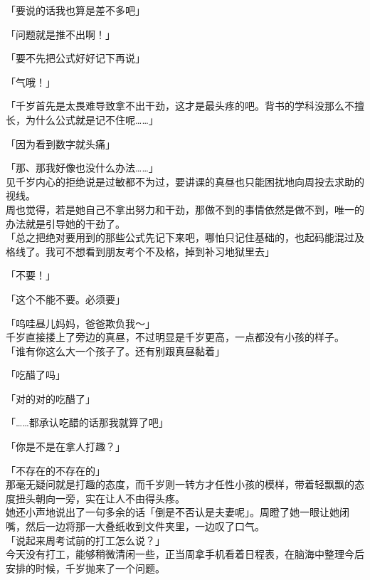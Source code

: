 「要说的话我也算是差不多吧」

「问题就是推不出啊！」

「要不先把公式好好记下再说」

「气哦！」

「千岁首先是太畏难导致拿不出干劲，这才是最头疼的吧。背书的学科没那么不擅长，为什么公式就是记不住呢……」

「因为看到数字就头痛」

「那、那我好像也没什么办法……」\\

见千岁内心的拒绝说是过敏都不为过，要讲课的真昼也只能困扰地向周投去求助的视线。\\

周也觉得，若是她自己不拿出努力和干劲，那做不到的事情依然是做不到，唯一的办法就是引导她的干劲了。\\

「总之把绝对要用到的那些公式先记下来吧，哪怕只记住基础的，也起码能混过及格线了。我可不想看到朋友考个不及格，掉到补习地狱里去」

「不要！」

「这个不能不要。必须要」

「呜哇昼儿妈妈，爸爸欺负我～」\\

千岁直接搂上了旁边的真昼，不过明显是千岁更高，一点都没有小孩的样子。\\

「谁有你这么大一个孩子了。还有别跟真昼黏着」

「吃醋了吗」

「对的对的吃醋了」

「……都承认吃醋的话那我就算了吧」

「你是不是在拿人打趣？」

「不存在的不存在的」\\

那毫无疑问就是打趣的态度，而千岁则一转方才任性小孩的模样，带着轻飘飘的态度扭头朝向一旁，实在让人不由得头疼。\\

她还小声地说出了一句多余的话「倒是不否认是夫妻呢」。周瞪了她一眼让她闭嘴，然后一边将那一大叠纸收到文件夹里，一边叹了口气。\\

「说起来周考试前的打工怎么说？」\\

今天没有打工，能够稍微清闲一些，正当周拿手机看着日程表，在脑海中整理今后安排的时候，千岁抛来了一个问题。\\

